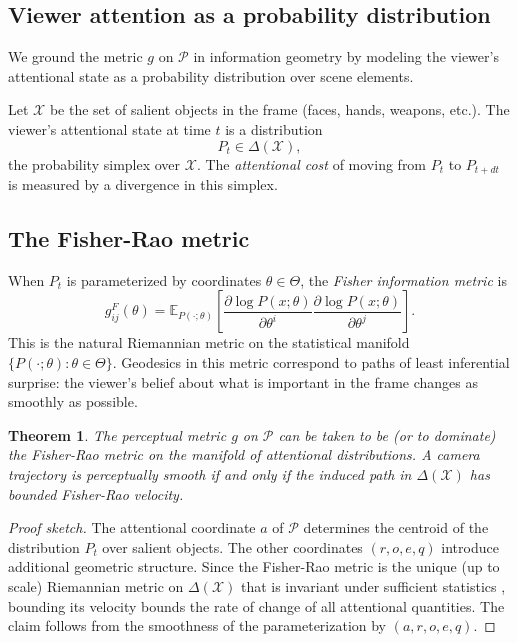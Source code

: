 \documentclass[12pt,a4paper]{article}
\theoremstyle{plain}
\newtheorem{theorem}{Theorem}[section]
\theoremstyle{definition}
\begin{document}
\subsection{Viewer attention as a probability distribution}

We ground the metric $g$ on $\mathcal{P}$ in information geometry by modeling
the viewer's attentional state as a probability distribution over scene elements.

Let $\mathcal{X}$ be the set of salient objects in the frame (faces, hands,
weapons, etc.). The viewer's attentional state at time $t$ is a distribution
\[
P_t \in \Delta(\mathcal{X}),
\]
the probability simplex over $\mathcal{X}$. The \emph{attentional cost} of
moving from $P_t$ to $P_{t+dt}$ is measured by a divergence in this simplex.

\subsection{The Fisher-Rao metric}

When $P_t$ is parameterized by coordinates $\theta \in \Theta$, the
\emph{Fisher information metric} is
\[
g_{ij}^F(\theta)
= \mathbb{E}_{P(\cdot;\theta)}\!\left[
\frac{\partial \log P(x;\theta)}{\partial\theta^i}
\frac{\partial \log P(x;\theta)}{\partial\theta^j}
\right].
\]
This is the natural Riemannian metric on the statistical manifold
$\{P(\cdot;\theta):\theta\in\Theta\}$. Geodesics in this metric correspond to
paths of least inferential surprise: the viewer's belief about what is important
in the frame changes as smoothly as possible.

\begin{theorem}
The perceptual metric $g$ on $\mathcal{P}$ can be taken to be (or to dominate)
the Fisher-Rao metric on the manifold of attentional distributions. A camera
trajectory is perceptually smooth if and only if the induced path in
$\Delta(\mathcal{X})$ has bounded Fisher-Rao velocity.
\end{theorem}

\begin{proof}[Proof sketch]
The attentional coordinate $a$ of $\mathcal{P}$ determines the centroid of the
distribution $P_t$ over salient objects. The other coordinates $(r,o,e,q)$
introduce additional geometric structure. Since the Fisher-Rao metric is the
unique (up to scale) Riemannian metric on $\Delta(\mathcal{X})$ that is
invariant under sufficient statistics \cite{chentsov1982}, bounding its velocity
bounds the rate of change of all attentional quantities. The claim follows from
the smoothness of the parameterization by $(a,r,o,e,q)$.
\end{proof}
\end{document}
